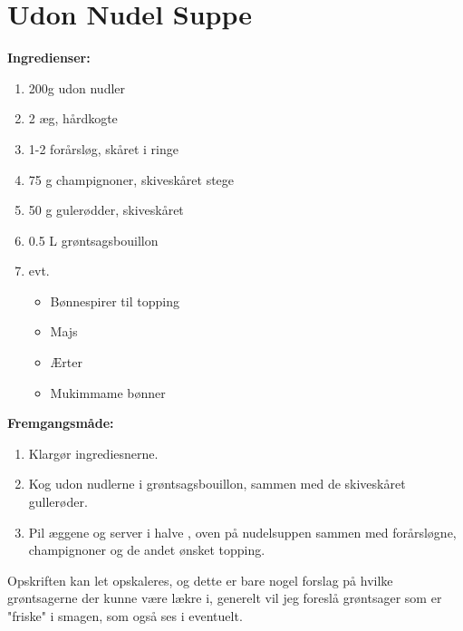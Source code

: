 \documentclass{book}
\begin{document}
\newpage \section{Udon Nudel Suppe}
\begin{minipage}[t]{0.5\textwidth}
\textbf{Ingredienser:}
\begin{enumerate}
    \item 200g udon nudler
    \item 2 æg, hårdkogte
    \item 1-2 forårsløg, skåret i ringe
    \item 75 g champignoner, skiveskåret stege
    \item 50 g gulerødder, skiveskåret 
    \item 0.5 L grøntsagsbouillon 
    \item evt.
    \begin{itemize}
        \item Bønnespirer til topping
        \item Majs
        \item Ærter
        \item Mukimmame bønner
    \end{itemize}
\end{enumerate}
\end{minipage}
\begin{minipage}[t]{0.5\textwidth}
\textbf{Fremgangsmåde:}
\begin{enumerate}
    \item Klargør ingrediesnerne.
    \item Kog udon nudlerne i grøntsagsbouillon, sammen med de skiveskåret gullerøder.
    \item Pil æggene og server i halve , oven på nudelsuppen sammen med forårsløgne, champignoner og de andet ønsket topping.  
\end{enumerate}
\end{minipage}
Opskriften kan let opskaleres, og dette er bare nogel forslag på hvilke grøntsagerne der kunne være lækre i, generelt vil jeg foreslå grøntsager som er "friske" i smagen, som også ses i eventuelt.
\end{document}
